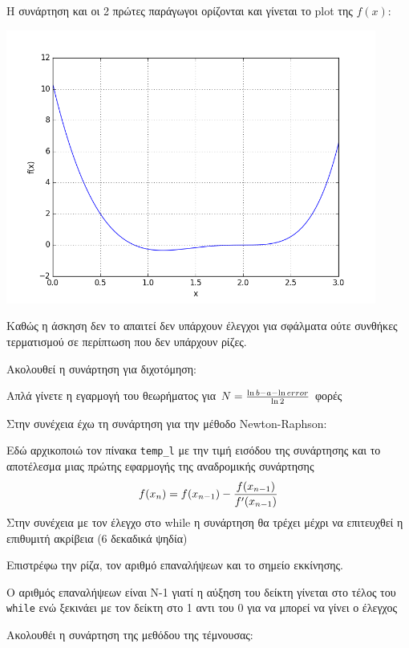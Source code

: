 \documentclass[12pt]{article}
\begin{document}
Η συνάρτηση και οι 2 πρώτες παράγωγοι
ορίζονται και γίνεται το plot της $f(x)$:


\begin{center}
\includegraphics[width=\linewidth, height=9cm]{plot.png}
\end{center}

Καθώς η άσκηση δεν το απαιτεί δεν υπάρχουν έλεγχοι για σφάλματα
ούτε συνθήκες τερματισμού σε περίπτωση που δεν υπάρχουν ρίζες.

Ακολουθεί η συνάρτηση για διχοτόμηση:


Απλά γίνετε η εγαρμογή του θεωρήματος για
$N = {{\ln{b-a} - \ln{error}}\over{\ln{2}}}$ φορές

Στην συνέχεια έχω τη συνάρτηση για την μέθοδο Newton-Raphson:


Εδώ αρχικοποιώ τον πίνακα \texttt{temp\_l} με την τιμή
εισόδου της συνάρτησης και το αποτέλεσμα μιας πρώτης εφαρμογής της
αναδρομικής συνάρτησης $$f(x_{n}) = f(x_{n-1}) - {{f(x_{n-1})} \over {f'(x_{n-1})}}$$
Στην συνέχεια με τον έλεγχο στο while η συνάρτηση θα τρέχει μέχρι να
επιτευχθεί η επιθυμιτή ακρίβεια (6 δεκαδικά ψηδία)

Επιστρέφω την ρίζα, τον αριθμό επαναλήψεων και το σημείο εκκίνησης.
\textcolor{mygray}{
\begin{footnotesize}
  Ο αριθμός επαναλήψεων είναι Ν-1 γιατί η αύξηση του δείκτη γίνεται
  στο τέλος του \texttt{while} ενώ ξεκινάει με τον δείκτη στο 1 αντι του 0
  για να μπορεί να γίνει ο έλεγχος
\end{footnotesize}}
\newpage
Ακολουθέι η συνάρτηση της μεθόδου της τέμνουσας:

\end{document}
